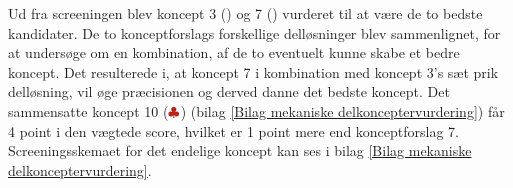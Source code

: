Ud fra screeningen blev koncept 3 (\cyanbox) og 7 (\orangeangle) vurderet til at være de to bedste kandidater. De to konceptforslags forskellige delløsninger blev sammenlignet, for at undersøge om en kombination, af de to eventuelt kunne skabe et bedre koncept. Det resulterede i, at koncept 7 i kombination med koncept 3's sæt prik delløsning, vil øge præcisionen og derved danne det bedste koncept. Det sammensatte koncept 10 ($\protect\mathcolor{BrickRed}{\clubsuit}$) (bilag \ref{Bilag mekaniske delkonceptervurdering}) får 4 point i den vægtede score, hvilket er 1 point mere end konceptforslag 7. Screeningsskemaet for det endelige koncept kan ses i bilag \ref{Bilag mekaniske delkonceptervurdering}. 



\begin{comment}
\begin{table}[H]
    \caption{}
    \centering
    \begin{tabular}{|c|c|c|c|} 
        \hline
        \multicolumn{4}{|c|}{\cellcolor{aaublue} \textcolor{white}{\textbf{Endelig mekanisk koncept }}} \\ \hline
        \rowcolor{lightgray!10} Bevægelse & Sætte prikker& Indspænding & Understøttelse \\ \hline
        \multicolumn{1}{|p{3.4cm}|}{
        \texttt{[image: Sections/5 Konceptgenerering/Media/lineær.png]}} &  
        \multicolumn{1}{p{3.4cm}|}{\texttt{[image: Sections/5 Konceptgenerering/Media/åbnelukke.png]}} &
        \multicolumn{1}{p{3.4cm}|}{\texttt{[image: Sections/5 Konceptgenerering/Media/Press på emnet.png]}} &
        \multicolumn{1}{p{3.4cm}|}{ \texttt{[image: Sections/5 Konceptgenerering/Media/Understøttelse plade.png]}} \\ \hline
    \end{tabular}
    \label{tab: endeligkonceptmekanisk}
\end{table}
\end{comment}



